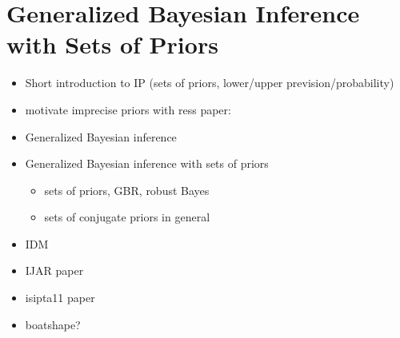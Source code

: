\chapter{Generalized Bayesian Inference with Sets of Priors}

\begin{itemize}
\item Short introduction to IP (sets of priors, lower/upper prevision/probability)
\item motivate imprecise priors with ress paper: \cite{Walter2013a}
\item Generalized Bayesian inference
\item Generalized Bayesian inference with sets of priors
 \begin{itemize}
 \item sets of priors, GBR, robust Bayes
 \item sets of conjugate priors in general
 \end{itemize}
\item IDM
\item IJAR paper \cite{Walter2009a}
\item isipta11 paper \cite{Walter2011a}
\item boatshape?
\end{itemize}